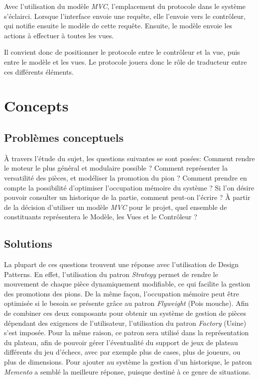 \documentclass[11pt]{article}
\begin{document}
Avec l'utilisation du modèle \emph{MVC}, l'emplacement du protocole dans le système s'éclairci. Lorsque l'interface envoie une requête, elle l'envoie vers le contrôleur, qui notifie ensuite le modèle de cette requête. Ensuite, le modèle envoie les actions à effectuer à toutes les vues. 

Il convient donc de positionner le protocole entre le contrôleur et la vue, puis entre le modèle et les vues. Le protocole jouera donc le rôle de traducteur entre ces différents éléments.
\newpage
\section{Concepts}
\label{sec-2}
\subsection{Problèmes conceptuels}
\label{sec-2-1}
À travers l'étude du sujet, les questions suivantes se sont posées: Comment rendre le moteur le plus général et modulaire possible ? Comment représenter la versatilité des pièces, et modéliser la promotion du pion ? Comment prendre en compte la possibilité d'optimiser l'occupation mémoire du système ? Si l'on désire pouvoir consulter un historique de la partie, comment peut-on l'écrire ? À partir de la décision d'utiliser un modèle \emph{MVC} pour le projet, quel ensemble de constituants représentera le Modèle, les Vues et le Contrôleur ?

\subsection{Solutions}
\label{sec-2-2}
La plupart de ces questions trouvent une réponse avec l'utilisation de Design Patterns. En effet, l'utilisation du patron \emph{Strategy} permet de rendre le mouvement de chaque pièce dynamiquement modifiable, ce qui facilite la gestion des promotions des pions. De la même façon, l'occupation mémoire peut être optimisée si le besoin se présente grâce au patron \emph{Flyweight} (Pois mouche). Afin de combiner ces deux composants pour obtenir un système de gestion de pièces dépendant des exigences de l'utilisateur, l'utilisation du patron \emph{Factory} (Usine) s'est imposée. Pour la même raison, ce patron sera utilisé dans la représentation du plateau, afin de pouvoir gérer l'éventualité du support de jeux de plateau différents du jeu d'échecs, avec par exemple plus de cases, plus de joueurs, ou plus de dimensions. Pour ajouter au système la gestion d'un historique, le patron \emph{Memento} a semblé la meilleure réponse, puisque destiné à ce genre de situations.
\end{document}
